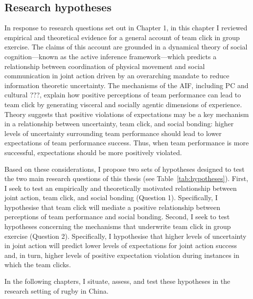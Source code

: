 \begin{CJK}{UTF8}{gbsn}
\section{Research hypotheses}
In response to research questions set out in Chapter 1, in this chapter I reviewed empirical and theoretical evidence for a general account of team click in group exercise. The claims of this account are grounded in a dynamical theory of social cognition---known as the active inference framework---which predicts a relationship between coordination of physical movement and social communication in joint action driven by an overarching mandate to reduce information theoretic uncertainty.  The mechanisms of the AIF, including PC and cultural ???, explain how positive perceptions of team performance can lead to team click by generating visceral and socially agentic dimensions of experience. Theory suggests that positive violations of expectations may be a key mechanism in a relationship between uncertainty, team click, and social bonding: higher levels of uncertainty surrounding team performance should lead to lower expectations of team performance success.  Thus, when team performance is more successful, expectations should be more positively violated.

Based on these considerations, I propose two sets of hypotheses designed to test the two main research questions of this thesis (see Table~\ref{tab:hypotheses}).  First, I seek to test an empirically and theoretically motivated relationship between joint action, team click, and social bonding (Question 1).  Specifically, I hypothesise that team click will mediate a positive relationship between perceptions of team performance and social bonding.  Second, I seek to test hypotheses concerning the mechanisms that underwrite team click in group exercise (Question 2).  Specifically, I hypothesise that higher levels of uncertainty in joint action will predict lower levels of expectations for joint action success and, in turn, higher levels of positive expectation violation during instances in which the team clicks.






In the following chapters, I situate, assess, and test these hypotheses in the research setting of rugby in China.









\end{CJK}
